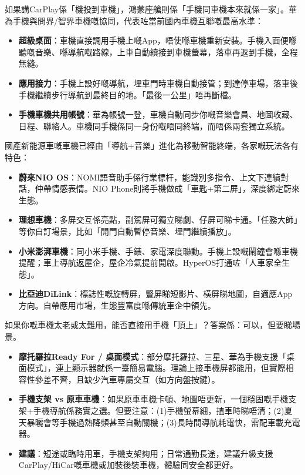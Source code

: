 如果講CarPlay係「機投到車機」，鴻蒙座艙則係「手機同車機本來就係一家」。華為手機與問界/智界車機嘅協同，代表咗當前國內車機互聯嘅最高水準：

\begin{itemize}
  \item \textbf{超級桌面}：車機直接調用手機上嘅App，唔使喺車機重新安裝。手機入面便喺聽嘅音樂、喺導航嘅路線，上車自動續接到車機螢幕，落車再返到手機，全程無縫。
  \item \textbf{應用接力}：手機上設好嘅導航，埋車門時車機自動接管；到達停車場，落車後手機繼續步行導航到最終目的地。「最後一公里」唔再斷檔。
  \item \textbf{手機車機共用帳號}：華為帳號一登，車機自動同步你嘅音樂會員、地圖收藏、日程、聯絡人。車機同手機係同一身份嘅唔同終端，而唔係兩套獨立系統。
\end{itemize}


國產新能源車嘅車機已經由「導航+音樂」進化為移動智能終端，各家嘅玩法各有特色：

\begin{itemize}
  \item \textbf{蔚來NIO OS}：NOMI語音助手係行業標杆，能識別多指令、上文下連續對話，仲帶情感表情。NIO Phone則將手機做成「車匙+第二屏」，深度綁定蔚來生態。
  \item \textbf{理想車機}：多屏交互係亮點，副駕屏可獨立睇劇、仔屏可睇卡通。「任務大師」等你自訂場景，比如「開門自動暫停音樂、埋門繼續播放」。
  \item \textbf{小米澎湃車機}：同小米手機、手錶、家電深度聯動。手機上設嘅鬧鐘會喺車機提醒；車上導航返屋企，屋企冷氣提前開啟。HyperOS打通咗「人車家全生態」。
  \item \textbf{比亞迪DiLink}：標誌性嘅旋轉屏，豎屏睇短影片、橫屏睇地圖，自適應App方向。自帶應用市場，生態豐富度喺傳統車企中領先。
\end{itemize}


如果你嘅車機太老或太難用，能否直接用手機「頂上」？答案係：可以，但要睇場景。

\begin{itemize}
  \item \textbf{摩托羅拉Ready For / 桌面模式}：部分摩托羅拉、三星、華為手機支援「桌面模式」，連上顯示器就係一臺簡易電腦。理論上接車機屏都能用，但實際相容性參差不齊，且缺少汽車專屬交互（如方向盤按鍵）。
  \item \textbf{手機支架 vs 原車車機}：如果原車車機卡頓、地圖唔更新，一個穩固嘅手機支架+手機導航係務實之選。但要注意：(1)手機螢幕細，揸車時睇唔清；(2)夏天暴曬會等手機過熱降頻甚至自動關機；(3)長時間導航耗電快，需配車載充電器。
  \item \textbf{建議}：短途或臨時用車，手機支架夠用；日常通勤長途，建議升級支援CarPlay/HiCar嘅車機或加裝後裝車機，體驗同安全都更好。
\end{itemize}

